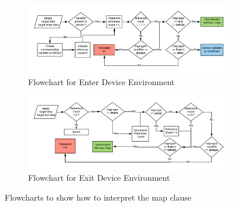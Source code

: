 \begin{figure}[h!]
\begin{subfigure}[b]{1\textwidth}
\centering
    \includegraphics[scale=0.6]{images/data-enter.png}
  \caption{Flowchart for Enter Device Environment}
    \label{host-device-flowchart}    
  \end{subfigure} 
  
  \begin{subfigure}[b]{1\textwidth}
  \centering
    \includegraphics[scale=0.6]{images/data-exit.png}
    \caption{Flowchart for Exit Device Environment}
    \label{device-host-flowchart}    
  \end{subfigure}
  \caption{Flowcharts to show how to interpret the map clause}    
  \label{mapSemantics}
\end{figure} 
